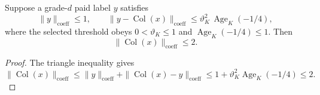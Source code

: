\begin{lemma}
\label{lem:ex-trace-bill-column-size}
Suppose a grade-$d$ paid label $y$ satisfies
\[
 \|y\|_{\mathrm{coeff}}\leq1,\qquad
 \|y-\operatorname{Col}(x)\|_{\mathrm{coeff}}
      \leq\vartheta_K^2\,\operatorname{Age}_K(-1/4),
\]
where the selected threshold obeys $0<\vartheta_K\leq1$ and
$\operatorname{Age}_K(-1/4)\leq1$. Then
\[
 \|\operatorname{Col}(x)\|_{\mathrm{coeff}}\leq2.
\]
\end{lemma}
\begin{proof}
The triangle inequality gives
\[
 \|\operatorname{Col}(x)\|_{\mathrm{coeff}}
   \leq\|y\|_{\mathrm{coeff}}
       +\|\operatorname{Col}(x)-y\|_{\mathrm{coeff}}
   \leq1+\vartheta_K^2\operatorname{Age}_K(-1/4)\leq2.
\]
\end{proof}

